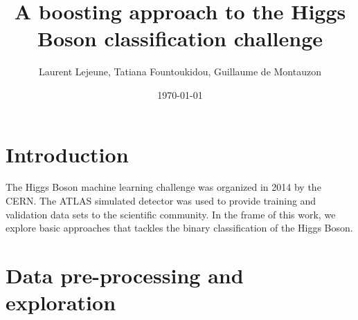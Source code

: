\documentclass[10pt,conference,compsocconf]{IEEEtran}
\author{Laurent Lejeune, Tatiana Fountoukidou, Guillaume de Montauzon}
\date{\today}
\title{A boosting approach to the Higgs Boson classification challenge}
\begin{document}
\maketitle
\section{Introduction}
\label{sec:orgheadline1}
The Higgs Boson machine learning challenge was organized in 2014 by the CERN. The ATLAS simulated detector was used to provide training and validation data sets to the scientific community. In the frame of this work, we explore basic approaches that tackles the binary classification of the Higgs Boson.
\section{Data pre-processing and exploration}
\label{sec:orgheadline7}
\end{document}
